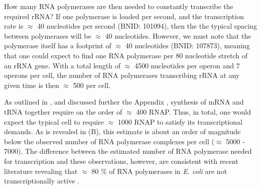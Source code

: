
How many RNA polymerases are then needed to constantly transcribe the required rRNA?
If one polymerase is loaded per second, and the transcription rate is $\approx$
40 nucleotides per second (BNID: 101094), then the the typical spacing between polymerases will
be $\approx$ 40 nucleotides. However, we must note that the polymerase itself
has a footprint of $\approx$ 40 nucleotides (BNID: 107873), meaning that one
could expect to find one RNA polymerase per 80 nucleotide stretch of an rRNA
gene.  With a total length of $\approx$ 4500 nucleotides per operon and 7
operons per cell, the number of RNA polymerases transcribing rRNA at any given
time is then $\approx$ 500 per cell.

As outlined in , and discussed further the Appendix
, synthesis of mRNA and tRNA together require on
the order of $\approx$ 400 RNAP. Thus, in total, one would expect the typical
cell to require $\approx$ 1000 RNAP to satisfy its transcriptional demands.
As is revealed in (B), this estimate is about an order of magnitude below the
observed number of RNA polymerase complexes per cell ($\approx$ 5000 - 7000).
The difference between the estimated number of RNA polymerase needed for
transcription and these observations, however, are consistent with recent literature
revealing that $\approx$ 80 \% of RNA polymerases in \textit{E. coli} are not
transcriptionally active \citep{patrick2015}.


